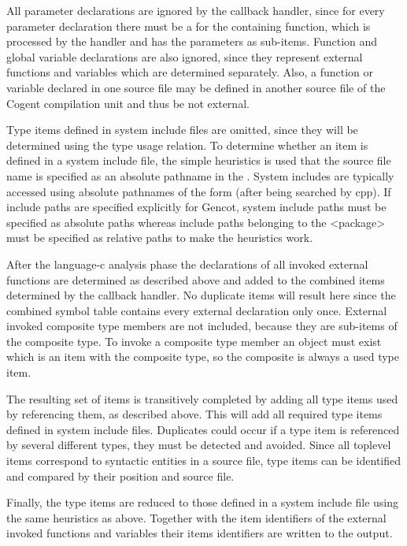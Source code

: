 All parameter declarations are ignored by the callback handler, since for every parameter declaration there must be 
a  for the containing function, which is processed by the handler and has the parameters as sub-items. 
Function and global variable declarations 
are also ignored, since they represent external functions and variables which are determined separately. Also,
a function or variable declared in one source file may be defined in another source file of the Cogent compilation unit and thus 
be not external. 

Type items defined in system include files are omitted, since they will be determined using the type usage relation. 
To determine whether
an item is defined in a system include file, the simple heuristics is used that the source file name is specified
as an absolute pathname in the . System includes are typically accessed using absolute pathnames of the 
form  (after being searched by cpp). If include paths are specified explicitly for Gencot, 
system include paths must be 
specified as absolute paths whereas include paths belonging to the <package> must be specified as relative paths
to make the heuristics work.

After the language-c analysis phase the declarations of all invoked external functions are determined 
as described above and added to the combined items determined by the callback handler. No duplicate items
will result here since the combined symbol table contains every external declaration only once.
External invoked composite type members are not included, because they are sub-items of the composite type. To invoke 
a composite type member an object must exist which is an item with the composite type, so the composite is always 
a used type item.

The resulting set of items is transitively completed by adding all type items used by referencing them,
as described above. This will add all required type items defined in system include files.
Duplicates could occur if a type item is referenced
by several different types, they must be detected and avoided. Since all toplevel items correspond to 
syntactic entities in a source file, type items can be identified and compared by their position and source file.

Finally, the type items are reduced to those defined in a system include file using the same
heuristics as above. Together with the item identifiers of the external invoked functions and variables their items
identifiers are written to the output.

